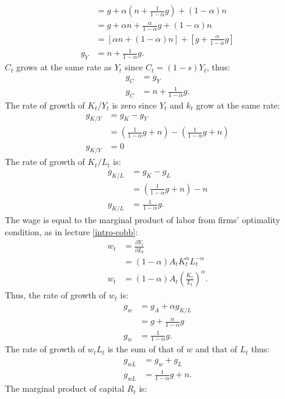 \documentclass[]{book}
\begin{document}
\begin{enumerate}
\[\begin{aligned}
  &= g+ \alpha\left(n+\frac{1}{1-\alpha}g\right)+(1-\alpha)n\\
  &= g+ \alpha n+\frac{\alpha}{1-\alpha}g+(1-\alpha)n \\
  &= \left[\alpha n+(1-\alpha)n\right] + \left[g+  \frac{\alpha}{1-\alpha}g\right] \\
  g_Y&=n+\frac{1}{1-\alpha}g.
  \end{aligned}
  \] \(C_t\) grows at the same rate as \(Y_t\) since \(C_t=(1-s)Y_t\),
  thus: \[
  \begin{aligned}
  g_C&=g_Y \\
  g_C&=n+\frac{1}{1-\alpha}g.
  \end{aligned}
  \] The rate of growth of \(K_t/Y_t\) is zero since \(Y_t\) and \(k_t\)
  grow at the same rate: \[
  \begin{aligned}
  g_{K/Y}&=g_K-g_Y\\
  &=\left(\frac{1}{1-\alpha}g + n\right)-\left(\frac{1}{1-\alpha}g + n\right)\\
  g_{K/Y}&=0
  \end{aligned}
  \] The rate of growth of \(K_t/L_t\) is: \[
  \begin{aligned}
  g_{K/L}&=g_K-g_L\\
  &= \left(\frac{1}{1-\alpha}g + n\right)-n \\
  g_{K/L}&=\frac{1}{1-\alpha}g.
  \end{aligned}
  \] The wage is equal to the marginal product of labor from firms'
  optimality condition, as in lecture \ref{intro-cobb}: \[
  \begin{aligned}
  w_t&=\frac{\partial Y_t}{\partial L_t}\\
  &=(1-\alpha)A_t K_t^\alpha L_t^{-\alpha}\\
  w_t&=(1-\alpha)A_t \left(\frac{K_t}{L_t}\right)^{\alpha}.
  \end{aligned}
  \] Thus, the rate of growth of \(w_t\) is: \[
  \begin{aligned}
  g_w&=g_A+\alpha g_{K/L}\\
  &=g+\frac{\alpha}{1-\alpha}g\\
  g_w&=\frac{1}{1-\alpha}g.
  \end{aligned}
  \] The rate of growth of \(w_t L_t\) is the sum of that of \(w\) and
  that of \(L_t\) thus: \[
  \begin{aligned}
  g_{wL}&=g_w + g_L \\
  g_{wL}&=\frac{1}{1-\alpha}g+n.
  \end{aligned}
  \] The marginal product of capital \(R_t\) is: \[
\]
\end{enumerate}
\end{document}
